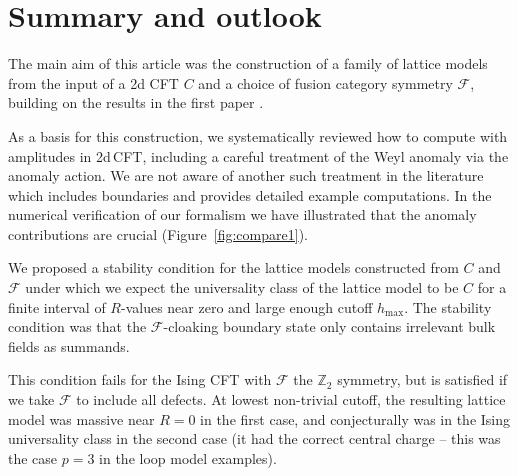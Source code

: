 \documentclass[11pt,a4paper]{article}
\numberwithin{equation}{section}
\begin{document}
\section{Summary and outlook}

The main aim of this article was the construction of a family of lattice models from the input of a 2d CFT $C$ and a choice of fusion category symmetry $\mathcal{F}$, building on the results in the first paper \cite{Brehm:2021wev}.

As a basis for this construction, we systematically reviewed how to compute with amplitudes in 2d\,CFT, including a careful treatment of the Weyl anomaly via the anomaly action. We are not aware of another such treatment in the literature which includes boundaries and provides detailed example computations. In the numerical verification of our formalism we have illustrated that the anomaly contributions are crucial (Figure~\ref{fig:compare1}).

We proposed a stability condition for the lattice models constructed from $C$ and $\mathcal{F}$ under which we expect the universality class of the lattice model to be $C$ for a finite interval of $R$-values near zero and large enough cutoff $h_\text{max}$. The stability condition was that the $\mathcal{F}$-cloaking boundary state only contains irrelevant bulk fields as summands.

This condition fails for the Ising CFT with $\mathcal{F}$ the $\mathbb{Z}_2$ symmetry, but is satisfied if we take $\mathcal{F}$ to include all defects. At lowest non-trivial cutoff, the resulting lattice model was massive near $R=0$ in the first case, and conjecturally was in the Ising universality class in the second case (it had the correct central charge -- this was the case $p=3$ in the loop model examples).
\end{document}
